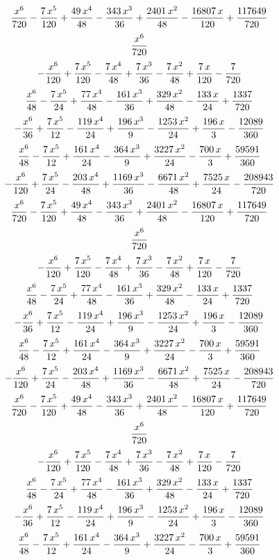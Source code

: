 $${{x^6}\over{720}}-{{7\,x^5}\over{120}}+{{49\,x^4}\over{48}}-{{343\,
 x^3}\over{36}}+{{2401\,x^2}\over{48}}-{{16807\,x}\over{120}}+{{
 117649}\over{720}}$$
$${{x^6}\over{720}}$$
$$-{{x^6}\over{120}}+{{7\,x^5}\over{120}}-{{7\,x^4}\over{48}}+{{7\,x^
 3}\over{36}}-{{7\,x^2}\over{48}}+{{7\,x}\over{120}}-{{7}\over{720}}$$
$${{x^6}\over{48}}-{{7\,x^5}\over{24}}+{{77\,x^4}\over{48}}-{{161\,x^
 3}\over{36}}+{{329\,x^2}\over{48}}-{{133\,x}\over{24}}+{{1337}\over{
 720}}$$
$$-{{x^6}\over{36}}+{{7\,x^5}\over{12}}-{{119\,x^4}\over{24}}+{{196\,
 x^3}\over{9}}-{{1253\,x^2}\over{24}}+{{196\,x}\over{3}}-{{12089
 }\over{360}}$$
$${{x^6}\over{48}}-{{7\,x^5}\over{12}}+{{161\,x^4}\over{24}}-{{364\,x
 ^3}\over{9}}+{{3227\,x^2}\over{24}}-{{700\,x}\over{3}}+{{59591
 }\over{360}}$$
$$-{{x^6}\over{120}}+{{7\,x^5}\over{24}}-{{203\,x^4}\over{48}}+{{1169
 \,x^3}\over{36}}-{{6671\,x^2}\over{48}}+{{7525\,x}\over{24}}-{{
 208943}\over{720}}$$
$${{x^6}\over{720}}-{{7\,x^5}\over{120}}+{{49\,x^4}\over{48}}-{{343\,
 x^3}\over{36}}+{{2401\,x^2}\over{48}}-{{16807\,x}\over{120}}+{{
 117649}\over{720}}$$
$${{x^6}\over{720}}$$
$$-{{x^6}\over{120}}+{{7\,x^5}\over{120}}-{{7\,x^4}\over{48}}+{{7\,x^
 3}\over{36}}-{{7\,x^2}\over{48}}+{{7\,x}\over{120}}-{{7}\over{720}}$$
$${{x^6}\over{48}}-{{7\,x^5}\over{24}}+{{77\,x^4}\over{48}}-{{161\,x^
 3}\over{36}}+{{329\,x^2}\over{48}}-{{133\,x}\over{24}}+{{1337}\over{
 720}}$$
$$-{{x^6}\over{36}}+{{7\,x^5}\over{12}}-{{119\,x^4}\over{24}}+{{196\,
 x^3}\over{9}}-{{1253\,x^2}\over{24}}+{{196\,x}\over{3}}-{{12089
 }\over{360}}$$
$${{x^6}\over{48}}-{{7\,x^5}\over{12}}+{{161\,x^4}\over{24}}-{{364\,x
 ^3}\over{9}}+{{3227\,x^2}\over{24}}-{{700\,x}\over{3}}+{{59591
 }\over{360}}$$
$$-{{x^6}\over{120}}+{{7\,x^5}\over{24}}-{{203\,x^4}\over{48}}+{{1169
 \,x^3}\over{36}}-{{6671\,x^2}\over{48}}+{{7525\,x}\over{24}}-{{
 208943}\over{720}}$$
$${{x^6}\over{720}}-{{7\,x^5}\over{120}}+{{49\,x^4}\over{48}}-{{343\,
 x^3}\over{36}}+{{2401\,x^2}\over{48}}-{{16807\,x}\over{120}}+{{
 117649}\over{720}}$$
$${{x^6}\over{720}}$$
$$-{{x^6}\over{120}}+{{7\,x^5}\over{120}}-{{7\,x^4}\over{48}}+{{7\,x^
 3}\over{36}}-{{7\,x^2}\over{48}}+{{7\,x}\over{120}}-{{7}\over{720}}$$
$${{x^6}\over{48}}-{{7\,x^5}\over{24}}+{{77\,x^4}\over{48}}-{{161\,x^
 3}\over{36}}+{{329\,x^2}\over{48}}-{{133\,x}\over{24}}+{{1337}\over{
 720}}$$
$$-{{x^6}\over{36}}+{{7\,x^5}\over{12}}-{{119\,x^4}\over{24}}+{{196\,
 x^3}\over{9}}-{{1253\,x^2}\over{24}}+{{196\,x}\over{3}}-{{12089
 }\over{360}}$$
$${{x^6}\over{48}}-{{7\,x^5}\over{12}}+{{161\,x^4}\over{24}}-{{364\,x
 ^3}\over{9}}+{{3227\,x^2}\over{24}}-{{700\,x}\over{3}}+{{59591
 }\over{360}}$$

